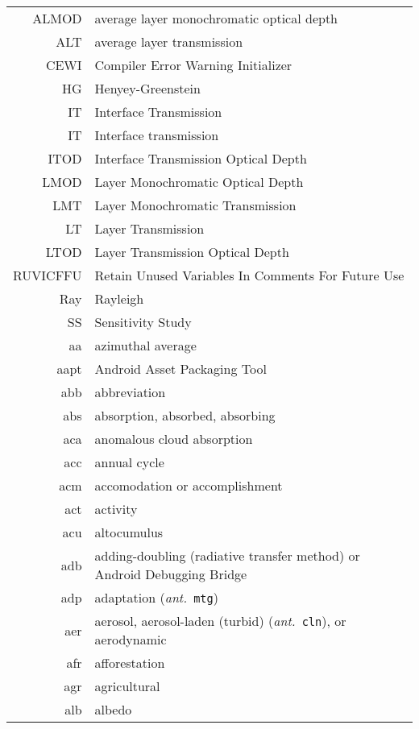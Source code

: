 \documentclass[12pt,twoside]{article}
\newcommand{\ant}[1]{(\textit{ant.}~\texttt{#1})}
\begin{document}
\begin{longtable}[>{\bfseries}l]{>{\ttfamily}r l}
ALMOD & average layer monochromatic optical depth \\
ALT & average layer transmission \\
CEWI & Compiler Error Warning Initializer \\
HG & Henyey-Greenstein \\
IT & Interface Transmission \\
IT & Interface transmission \\
ITOD & Interface Transmission Optical Depth \\
LMOD & Layer Monochromatic Optical Depth \\
LMT & Layer Monochromatic Transmission \\
LT & Layer Transmission \\
LTOD & Layer Transmission Optical Depth \\
RUVICFFU & Retain Unused Variables In Comments For Future Use \\
Ray & Rayleigh \\
SS & Sensitivity Study \\
aa & azimuthal average \\
aapt & Android Asset Packaging Tool \\
abb & abbreviation \\
abs & absorption, absorbed, absorbing \\
aca & anomalous cloud absorption \\
acc & annual cycle \\
acm & accomodation or accomplishment \\
act & activity \\
acu & altocumulus \\
adb & adding-doubling (radiative transfer method) or Android Debugging Bridge \\
adp & adaptation \ant{mtg} \\
aer & aerosol, aerosol-laden (turbid) \ant{cln}, or aerodynamic \\
afr & afforestation \\
agr & agricultural \\
alb & albedo \\

\end{longtable}
\end{document}
